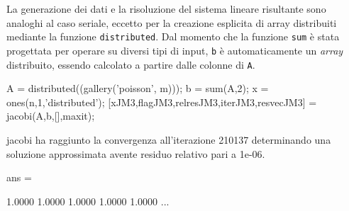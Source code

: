 La generazione dei dati e la risoluzione del sistema lineare risultante sono analoghi al caso seriale, eccetto per la creazione esplicita di array 
distribuiti mediante la funzione \lstinline{distributed}.\newline
Dal momento che la funzione \lstinline{sum} \`e stata progettata per operare su diversi tipi di input, \lstinline{b} \`e automaticamente un \textit{array} distribuito, essendo 
calcolato a partire dalle colonne di \lstinline{A}.
\begin{matlabcode}
A = distributed((gallery('poisson', m)));
b = sum(A,2);
x = ones(n,1,'distributed');
[xJM3,flagJM3,relresJM3,iterJM3,resvecJM3] = jacobi(A,b,[],maxit);
\end{matlabcode}
\begin{matlaboutput}
    jacobi ha raggiunto la convergenza all'iterazione 210137
    determinando una soluzione approssimata avente residuo
    relativo pari a 1e-06.

    ans =

    1.0000    1.0000    1.0000    1.0000    1.0000    ...
\end{matlaboutput}
